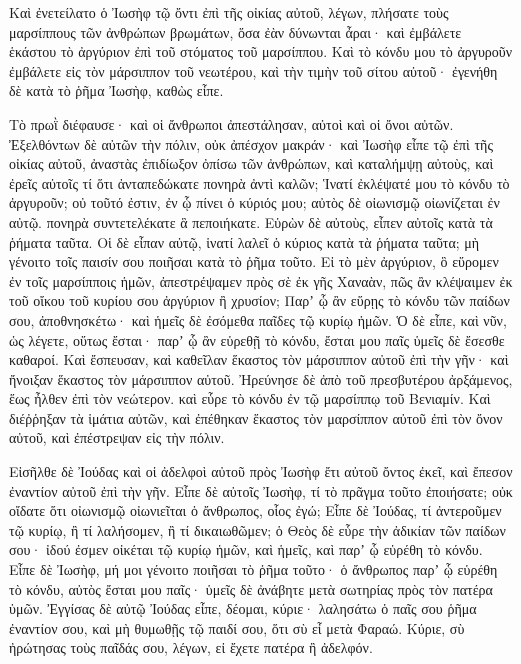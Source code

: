 {Καὶ ἐνετείλατο ὁ Ἰωσὴφ τῷ ὄντι ἐπὶ τῆς οἰκίας αὐτοῦ, λέγων, πλήσατε τοὺς μαρσίππους τῶν ἀνθρώπων βρωμάτων, ὅσα ἐὰν δύνωνται ἆραι· καὶ ἐμβάλετε ἑκάστου τὸ ἀργύριον ἐπὶ τοῦ στόματος τοῦ μαρσίππου.
Καὶ τὸ κόνδυ μου τὸ ἀργυροῦν ἐμβάλετε εἰς τὸν μάρσιππον τοῦ νεωτέρου, καὶ τὴν τιμὴν τοῦ σίτου αὐτοῦ· ἐγενήθη δὲ κατὰ τὸ ῥῆμα Ἰωσὴφ, καθὼς εἶπε.
\par }{\PP {}Τὸ πρωῒ διέφαυσε· καὶ οἱ ἄνθρωποι ἀπεστάλησαν, αὐτοὶ καὶ οἱ ὄνοι αὐτῶν.
Ἐξελθόντων δὲ αὐτῶν τὴν πόλιν, οὐκ ἀπέσχον μακράν· καὶ Ἰωσὴφ εἶπε τῷ ἐπὶ τῆς οἰκίας αὐτοῦ, ἀναστὰς ἐπιδίωξον ὀπίσω τῶν ἀνθρώπων, καὶ καταλήμψῃ αὐτοὺς, καὶ ἐρεῖς αὐτοῖς τί ὅτι ἀνταπεδώκατε πονηρὰ ἀντὶ καλῶν;
Ἱνατί ἐκλέψατέ μου τὸ κόνδυ τὸ ἀργυροῦν; οὐ τοῦτό ἐστιν, ἐν ᾧ πίνει ὁ κύριός μου; αὐτὸς δὲ οἰωνισμῷ οἰωνίζεται ἐν αὐτῷ. πονηρὰ συντετελέκατε ἃ πεποιήκατε.
Εὑρὼν δὲ αὐτοὺς, εἶπεν αὐτοῖς κατὰ τὰ ῥήματα ταῦτα.
Οἱ δὲ εἶπαν αὐτῷ, ἱνατί λαλεῖ ὁ κύριος κατὰ τὰ ῥήματα ταῦτα; μὴ γένοιτο τοῖς παισίν σου ποιῆσαι κατὰ τὸ ῥῆμα τοῦτο.
Εἰ τὸ μὲν ἀργύριον, ὃ εὕρομεν ἐν τοῖς μαρσίπποις ἡμῶν, ἀπεστρέψαμεν πρὸς σὲ ἐκ γῆς Χαναὰν, πῶς ἂν κλέψαιμεν ἐκ τοῦ οἴκου τοῦ κυρίου σου ἀργύριον ἢ χρυσίον;
Παρʼ ᾧ ἂν εὕρῃς τὸ κόνδυ τῶν παίδων σου, ἀποθνησκέτω· καὶ ἡμεῖς δὲ ἐσόμεθα παῖδες τῷ κυρίῳ ἡμῶν.
Ὁ δὲ εἶπε, καὶ νῦν, ὡς λέγετε, οὕτως ἔσται· παρʼ ᾧ ἂν εὑρεθῇ τὸ κόνδυ, ἔσται μου παῖς ὑμεῖς δὲ ἔσεσθε καθαροί.
Καὶ ἔσπευσαν, καὶ καθεῖλαν ἕκαστος τὸν μάρσιππον αὐτοῦ ἐπὶ τὴν γῆν· καὶ ἤνοιξαν ἕκαστος τὸν μάρσιππον αὐτοῦ.
Ἠρεύνησε δὲ ἀπὸ τοῦ πρεσβυτέρου ἀρξάμενος, ἕως ἦλθεν ἐπὶ τὸν νεώτερον. καὶ εὗρε τὸ κόνδυ ἐν τῷ μαρσίππῳ τοῦ Βενιαμίν.
Καὶ διέῤῥηξαν τὰ ἱμάτια αὐτῶν, καὶ ἐπέθηκαν ἕκαστος τὸν μαρσίππον αὐτοῦ ἐπὶ τὸν ὄνον αὐτοῦ, καὶ ἐπέστρεψαν εἰς τὴν πόλιν.
\par }{\PP {}Εἰσῆλθε δὲ Ἰούδας καὶ οἱ ἀδελφοὶ αὐτοῦ πρὸς Ἰωσὴφ ἔτι αὐτοῦ ὄντος ἐκεῖ, καὶ ἔπεσον ἐναντίον αὐτοῦ ἐπὶ τὴν γῆν.
Εἶπε δὲ αὐτοῖς Ἰωσὴφ, τί τὸ πρᾶγμα τοῦτο ἐποιήσατε; οὐκ οἴδατε ὅτι οἰωνισμῷ οἰωνιεῖται ὁ ἄνθρωπος, οἷος ἐγώ;
Εἶπε δὲ Ἰούδας, τί ἀντεροῦμεν τῷ κυρίῳ, ἢ τί λαλήσομεν, ἢ τί δικαιωθῶμεν; ὁ Θεὸς δὲ εὗρε τὴν ἀδικίαν τῶν παίδων σου· ἰδού ἐσμεν οἰκέται τῷ κυρίῳ ἡμῶν, καὶ ἡμεῖς, καὶ παρʼ ᾧ εὑρέθη τὸ κόνδυ.
Εἶπε δὲ Ἰωσὴφ, μή μοι γένοιτο ποιῆσαι τὸ ῥῆμα τοῦτο· ὁ ἄνθρωπος παρʼ ᾧ εὑρέθη τὸ κόνδυ, αὐτὸς ἔσται μου παῖς· ὑμεῖς δὲ ἀνάβητε μετὰ σωτηρίας πρὸς τὸν πατέρα ὑμῶν.
Ἐγγίσας δὲ αὐτῷ Ἰούδας εἶπε, δέομαι, κύριε· λαλησάτω ὁ παῖς σου ῥῆμα ἐναντίον σου, καὶ μὴ θυμωθῇς τῷ παιδί σου, ὅτι σὺ εἶ μετὰ Φαραώ.
Κύριε, σὺ ἠρώτησας τοὺς παῖδάς σου, λέγων, εἰ ἔχετε πατέρα ἢ ἀδελφόν.
}

